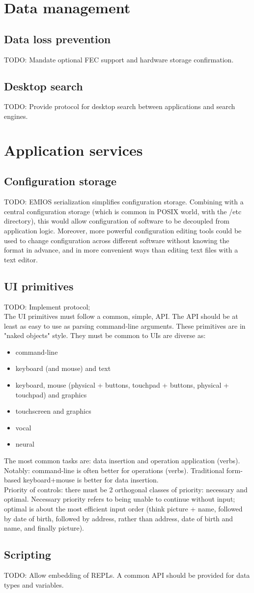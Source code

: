 \documentclass[a4paper,utf8,11pt]{article}
\begin{document}
	\section{Data management}
	\subsection{Data loss prevention}
	TODO: Mandate optional FEC support and hardware storage confirmation.
	\subsection{Desktop search}
	TODO: Provide protocol for desktop search between applications and search engines.
	\clearpage
	\section{Application services}
	\subsection{Configuration storage}
	TODO: EMIOS serialization simplifies configuration storage. Combining with a central configuration storage (which is common in POSIX world, with the /etc directory), this would allow configuration of software to be decoupled from application logic. Moreover, more powerful configuration editing tools could be used to change configuration across different software without knowing the format in advance, and in more convenient ways than editing text files with a text editor.
	\subsection{UI primitives}
	TODO: Implement protocol;\\
	The UI primitives must follow a common, simple, API. The API should be at least as easy to use as parsing command-line arguments. These primitives are in "naked objects" style. They must be common to UIs are diverse as:
	\begin{itemize}
		\item command-line
		\item keyboard (and mouse) and text
		\item keyboard, mouse (physical + buttons, touchpad + buttons, physical + touchpad) and graphics
		\item touchscreen and graphics
		\item vocal
		\item neural
	\end{itemize}
	The most common tasks are: data insertion and operation application (verbs).\\
	Notably: command-line is often better for operations (verbs). Traditional form-based keyboard+mouse is better for data insertion.\\
	Priority of controls: there must be 2 orthogonal classes of priority: necessary and optimal. Necessary priority refers to being unable to continue without input; optimal is about the most efficient input order (think picture + name, followed by date of birth, followed by address, rather than address, date of birth and name, and finally picture).
	\subsection{Scripting}
	TODO: Allow embedding of REPLs. A common API should be provided for data types and variables.
\end{document}
